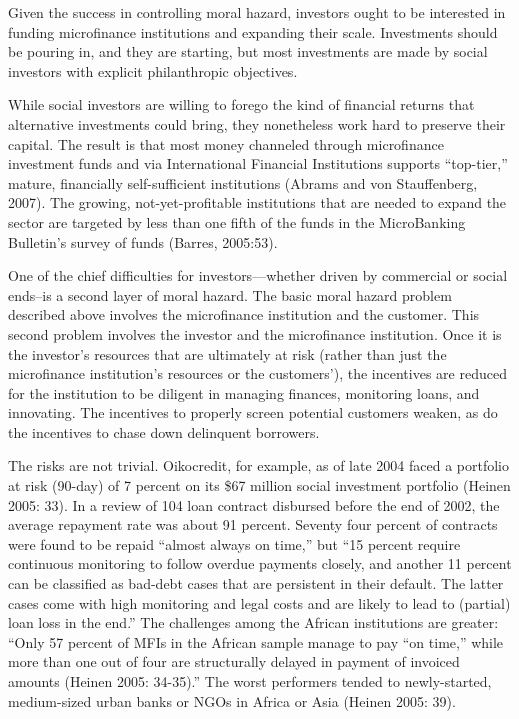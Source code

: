 \documentclass{article} %
\begin{document}
Given the success in controlling moral hazard, investors ought to be interested in funding microfinance institutions and expanding their scale. Investments should be pouring in, and they are starting, but most investments are made by social investors with explicit philanthropic objectives. 

While social investors are willing to forego the kind of financial returns that alternative investments could bring, they nonetheless work hard to preserve their capital. The result is that most money channeled through microfinance investment funds and via International Financial Institutions supports ``top-tier,'' mature, financially self-sufficient institutions (Abrams and von Stauffenberg, 2007).  The growing, not-yet-profitable institutions that are needed to expand the sector are targeted by less than one fifth of the funds in the MicroBanking Bulletin's survey of funds (Barres, 2005:53). 

One of the chief difficulties for investors---whether driven by commercial or social ends--is a second layer of moral hazard. The basic moral hazard problem described above involves the microfinance institution and the customer. This second problem involves the investor and the microfinance institution. Once it is the investor's resources that are ultimately at risk (rather than just the microfinance institution's resources or the customers'), the incentives are reduced for the institution to be diligent in managing finances, monitoring loans, and innovating. The incentives to properly screen potential customers weaken, as do the incentives to chase down delinquent borrowers.  

The risks are not trivial. Oikocredit, for example, as of late 2004 faced a portfolio at risk (90-day) of 7 percent on its \$67 million social investment portfolio (Heinen 2005: 33).  In a review of 104 loan contract disbursed before the end of 2002, the average repayment rate was about 91 percent. Seventy four percent of contracts were found to be repaid ``almost always on time,'' but ``15 percent require continuous monitoring to follow overdue payments closely, and another 11 percent can be classified as bad-debt cases that are persistent in their default. The latter cases come with high monitoring and legal costs and are likely to lead to (partial) loan loss in the end.'' The challenges among the African institutions are greater: ``Only 57 percent of MFIs in the African sample manage to pay ``on time,'' while more than one out of four are structurally delayed in payment of invoiced amounts (Heinen 2005: 34-35).''  The worst performers tended to newly-started, medium-sized urban banks or NGOs in Africa or Asia (Heinen 2005: 39). 
\end{document}
